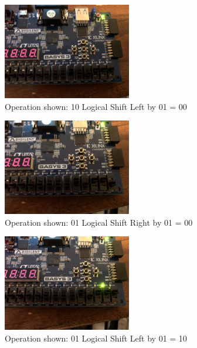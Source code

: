 \documentclass[11pt]{article}
\begin{document}
\begin{figure}[H]
\begin{center}
	\includegraphics[width=0.5\textwidth]{./images/p1/IMG_1899.jpg}
	\caption{\label{fig:alu_res4}Operation shown: 10 Logical Shift Left by 01 = 00}
\end{center}
\end{figure}

\begin{figure}[H]
\begin{center}
	\includegraphics[width=0.5\textwidth]{./images/p1/IMG_2036.jpg}
	\caption{\label{fig:alu_res5}Operation shown: 01 Logical Shift Right by 01 = 00}
\end{center}
\end{figure}

\begin{figure}[H]
\begin{center}
	\includegraphics[width=0.5\textwidth]{./images/p1/IMG_2997.jpg}
	\caption{\label{fig:alu_res6}Operation shown: 01 Logical Shift Left by 01 = 10}
\end{center}
\end{figure}
\end{document}
